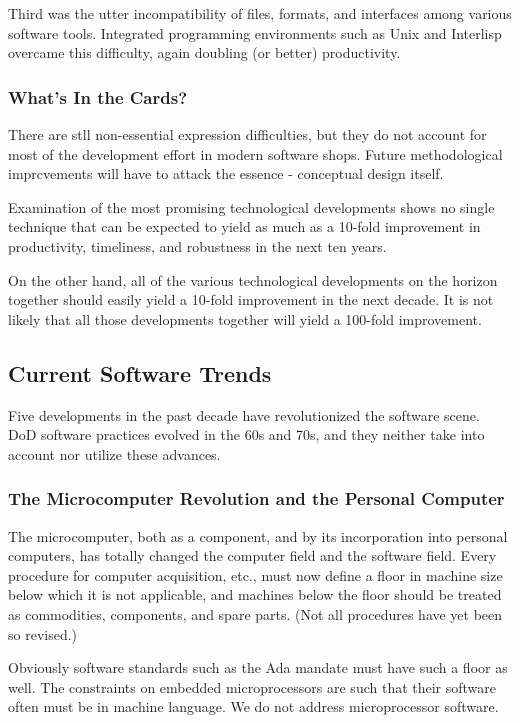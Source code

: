 \documentclass[12pt,final]{article}
\begin{document}
Third was the utter incompatibility of files, formats, and interfaces among
various software tools. Integrated programming environments such as Unix and
Interlisp overcame this difficulty, again doubling (or better) productivity.

\subsubsection*{What’s In the Cards?}

There are stll non-essential expression difficulties, but they do not account
for most of the development effort in modern software shops. Future
methodological imprcvements will have to attack the essence - conceptual design
itself.

Examination of the most promising technological developments shows no single
technique that can be expected to yield as much as a 10-fold improvement in
productivity, timeliness, and robustness in the next ten years.

On the other hand, all of the various technological developments on the horizon
together should easily yield a 10-fold improvement in the next decade. It is
not likely that all those developments together will yield a 100-fold
improvement.

\subsection{Current Software Trends}

Five developments in the past decade have revolutionized the software scene.
DoD software practices evolved in the 60s and 70s, and they neither take
into account nor utilize these advances.

\subsubsection*{The Microcomputer Revolution and the Personal Computer}

The microcomputer, both as a component, and by its incorporation into personal
computers, has totally changed the computer field and the software field. Every
procedure for computer acquisition, etc., must now define a floor in machine
size below which it is not applicable, and machines below the floor should be
treated as commodities, components, and spare parts. (Not all procedures have
yet been so revised.)

Obviously software standards such as the Ada mandate must have such a floor as
well. The constraints on embedded microprocessors are such that their
software often must be in machine language. We do not address microprocessor
software.
\end{document}

